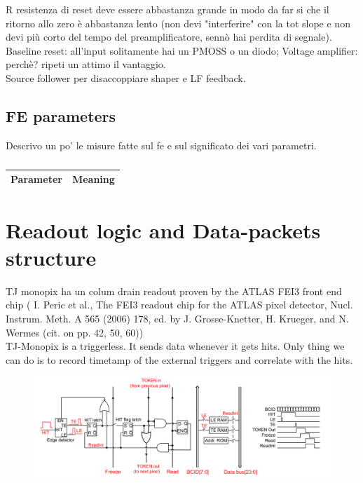     R resistenza di reset deve essere abbastanza grande in modo da far si che il
    ritorno allo zero è abbastanza lento (non devi "interferire" con la tot slope
    e non devi più corto del tempo del preamplificatore, sennò hai perdita di segnale).\\
    Baseline reset: all'input solitamente hai un PMOSS o un diodo;  
    Voltage amplifier: perchè? ripeti un attimo il vantaggio. \\
    Source follower per disaccoppiare shaper e LF feedback.\\

    \subsection{FE parameters}
    Descrivo un po' le misure fatte sul fe e sul significato dei vari parametri.\\
    \begin{table}
        \begin{center}
        \begin{tabular}{|c | c |}
        \hline
        Parameter & Meaning\\
        \hline
        \hline
    
        \hline
        \end{tabular}
        \caption{}
        \label{tab:FE-parameters}
        \end{center}
     \end{table}
    
\section{Readout logic and Data-packets structure}
    TJ monopix ha un colum drain readout proven by the ATLAS FEI3 front end chip (
    I. Peric et al., The FEI3 readout chip for the ATLAS pixel detector,
    Nucl. Instrum. Meth. A 565 (2006) 178, ed. by J. Grosse-Knetter, H. Krueger, and N. Wermes
    (cit. on pp. 42, 50, 60))\\

    TJ-Monopix is a triggerless. It sends data whenever it gets hits. Only thing we can do is to record timetamp of the external triggers and correlate with the hits. 
    \begin{figure}[h!]
        \centering
        \includegraphics[width=.7\linewidth]{figures/Monopix1/Monopix1_readout_schematics.png}
        \caption{}
        \label{fig:Monopix1_readout_schematics}
    \end{figure}

